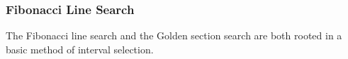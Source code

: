 \subsubsection{Fibonacci Line Search}
The Fibonacci line search and the Golden section search are both rooted in a basic method of interval selection.